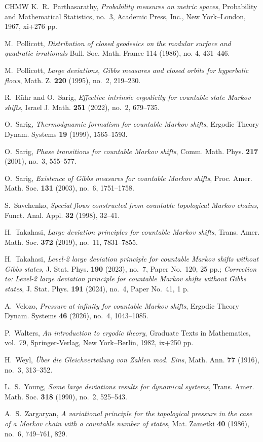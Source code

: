 \documentclass[letterpaper,11pt]{amsart}
\numberwithin{equation}{section}     %
\begin{document}
\begin{thebibliography}{CHMW}
K.~R.~Parthasarathy,
\emph{Probability measures on metric spaces},
Probability and Mathematical Statistics, no.~3, Academic Press, Inc., New York--London, 1967, xi+276 pp.

M.~Pollicott,
\emph{Distribution of closed geodesics on the modular surface and quadratic irrationals} Bull. Soc. Math. France 114 (1986), no. 4, 431--446.

M.~Pollicott,
\emph{Large deviations, Gibbs measures and closed orbits for hyperbolic flows},
Math. Z. \textbf{220} (1995), no.~2, 219--230.

R.~R\"uhr and O.~Sarig,
\emph{Effective intrinsic ergodicity for countable state Markov shifts},
Israel J. Math. \textbf{251} (2022), no.~2, 679--735.

O.~Sarig,
\emph{Thermodynamic formalism for countable Markov shifts},
Ergodic Theory Dynam. Systems \textbf{19} (1999), 1565--1593.

O.~Sarig,
\emph{Phase transitions for countable Markov shifts},
Comm. Math. Phys. \textbf{217} (2001), no.~3, 555--577.

O.~Sarig,
\emph{Existence of Gibbs measures for countable Markov shifts},
Proc. Amer. Math. Soc. \textbf{131} (2003), no.~6, 1751--1758.

S.~Savchenko,
\emph{Special flows constructed from countable topological Markov chains},
Funct. Anal. Appl. \textbf{32} (1998), 32--41.

H.~Takahasi,
\emph{Large deviation principles for countable Markov shifts},
Trans. Amer. Math. Soc. \textbf{372} (2019), no.~11, 7831--7855.

H.~Takahasi,
\emph{Level-2 large deviation principle for countable Markov shifts without Gibbs states},
J. Stat. Phys. \textbf{190} (2023), no.~7, Paper No.~120, 25 pp.;
\emph{Correction to: Level-2 large deviation principle for countable Markov shifts without Gibbs states},
J. Stat. Phys. \textbf{191} (2024), no.~4, Paper No.~41, 1 p.

A.~Velozo,
\emph{Pressure at infinity for countable Markov shifts},
Ergodic Theory Dynam. Systems \textbf{46} (2026), no.~4, 1043--1085.

P.~Walters,
\emph{An introduction to ergodic theory},
Graduate Texts in Mathematics, vol.~79, Springer-Verlag, New York--Berlin, 1982, ix+250 pp.

H.~Weyl,
\emph{\"Uber die Gleichverteilung von Zahlen mod. Eins},
Math. Ann. \textbf{77} (1916), no.~3, 313--352.

L.~S.~Young,
\emph{Some large deviations results for dynamical systems},
Trans. Amer. Math. Soc. \textbf{318} (1990), no.~2, 525--543.

A.~S.~Zargaryan,
\emph{A variational principle for the topological pressure in the case of a Markov chain with a countable number of states},
Mat. Zametki \textbf{40} (1986), no.~6, 749--761, 829.

\end{thebibliography}
\end{document}
